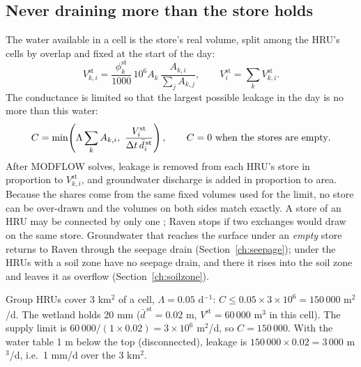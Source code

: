 \subsection{Never draining more than the store holds}
The water available in a cell is the store's real volume, split among the HRU's cells by overlap and fixed at the start
of the day:
\begin{equation}
V^{\mathrm{st}}_{k,i}=\frac{\phi^{\mathrm{st}}_k}{1000}\,10^{6}A_k\,\frac{A_{k,i}}{\sum_jA_{k,j}},\qquad V^{\mathrm{st}}_i=\sum_kV^{\mathrm{st}}_{k,i} .
\end{equation}
The conductance is limited so that the largest possible leakage in the day is no more than this water:
\begin{equation}
C=\min\!\left(\Lambda\sum_kA_{k,i},\ \frac{V^{\mathrm{st}}_i}{\dt\,\bar d^{\,\mathrm{st}}_i}\right),\qquad C=0\ \text{when the stores are empty}.
\end{equation}
After MODFLOW solves, leakage is removed from each HRU's store in proportion to $V^{\mathrm{st}}_{k,i}$, and groundwater discharge is
added in proportion to area. Because the shares come from the same fixed volumes used for the limit, no store can be
over-drawn and the volumes on both sides match exactly. A store of an HRU may be connected by only one
; Raven stops if two exchanges would draw on the same store. Groundwater that reaches the surface under an \emph{empty} store
returns to Raven through the seepage drain (Section~\ref{ch:seepage}); under  the HRUs with a soil zone
have no seepage drain, and there it rises into the soil zone and leaves it as overflow (Section~\ref{ch:soilzone}).
\begin{example}
Group HRUs cover 3 km$^2$ of a cell, $\Lambda=0.05$ d$^{-1}$: $C\le0.05\times3\times10^6=150\,000$ m$^2$/d. The wetland holds
20 mm ($\bar d^{\,\mathrm{st}}=0.02$ m, $V^{\mathrm{st}}=60\,000$ m$^3$ in this cell). The supply limit is $60\,000/(1\times0.02)=3\times10^6$ m$^2$/d, so
$C=150\,000$. With the water table 1 m below the top (disconnected), leakage is $150\,000\times0.02=3\,000$ m$^3$/d, i.e.\
1 mm/d over the 3 km$^2$.
\end{example}


